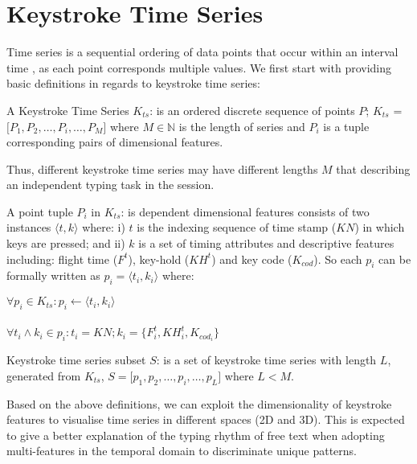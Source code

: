 \documentclass[runningheads,a4paper]{llncs}
\begin{document}
  
\section{Keystroke Time Series} \label{sec:keystrokeTimeSeries}

Time series is a sequential ordering of data points that occur within an interval time \cite{wang2013experimental}, as each point corresponds multiple values. We first start with providing basic definitions in regards to keystroke time series:

\begin{definition}{A Keystroke Time Series $K_{ts}$:}
is an ordered discrete sequence of points $P$; $K_{ts}$ = $\big[ P_1,P_2,\dots,P_i,\dots,P_M\big]$ where $M\in\mathbb{N}$ is the length of series and $P_i$ is a tuple corresponding pairs of dimensional features. 
\end{definition}

\noindent Thus, different keystroke time series may have different lengths $M$ that describing an independent typing task in the session. 

\begin{definition}{A point tuple $P_i$ in $K_{ts}$:}
is dependent dimensional features consists of two instances $\langle t,k\rangle$ where: i) $t$ is the indexing sequence of time stamp ($KN$) in which keys are pressed; and ii) $k$ is a set of timing attributes and descriptive features including: flight time ($F^t$), key-hold ($KH^t$) and key code ($K_{cod}$). So each $p_i$ can be formally written as $p_i = \langle t_i,k_i \rangle$ where: \\
\begin{itemize}
\textendash $\forall p_i \in K_{ts} : p_i \leftarrow \langle t_i,k_i \rangle$\\\\
\textendash $\forall t_i \land k_i \in p_i : t_i = KN; k_i = \{F^t_i, KH^t_i, K_{cod_i} \}$
\end{itemize}
\end{definition}

\begin{definition}{Keystroke time series subset $S$:}
is a set of keystroke time series with length $L$, generated from $K_{ts}$, $S=\big[p_1,p_2,\dots,p_i,\dots,p_L\big]$ where $L<M$. 
\end{definition}

\noindent Based on the above definitions, we can exploit the dimensionality of keystroke features to visualise time series in different spaces (2D and 3D). This is expected to give a better explanation of the typing rhythm of free text when adopting multi-features in the temporal domain to discriminate unique patterns.
\end{document}
